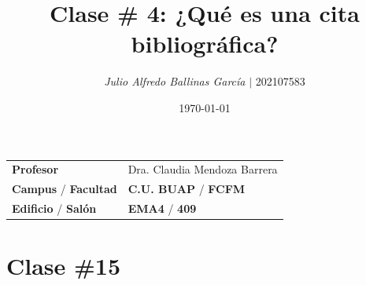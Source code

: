 \documentclass{article}
\title{ \textcolor{Tarawera}{\textbf{Clase \# 4}}: \textcolor{Cinnabar}{\textbf{¿Qué es una cita bibliográfica?}}}
\author{\emph{Julio Alfredo Ballinas García} $\boldsymbol{\mid}$ 202107583}
\date{\today}
\begin{document}
\maketitle



\begin{mybox}
	\noindent\begin{tabular}{@{}ll}
		{\bfseries{Profesor}} & Dra. Claudia Mendoza Barrera\\
		\textcolor{prussianblue}{\bfseries{Campus}} / \textcolor{trueblue}{\bfseries{Facultad}}  & \textcolor{prussianblue}{\bfseries{C.U. BUAP}} /  \textcolor{trueblue}{\bfseries{FCFM}} \\
		\textcolor{prussianblue}{\bfseries{Edificio}} /  \textcolor{trueblue}{\bfseries{Salón}}    & 	\textcolor{prussianblue}{\bfseries{EMA4}} /  \textcolor{trueblue}{\bfseries{409}}   
	\end{tabular} 
\end{mybox} \vspace{1cm}


	



\tableofcontents \vspace{0.5cm}


\section{Clase \#15} \vspace{0.5cm}
\end{document}
